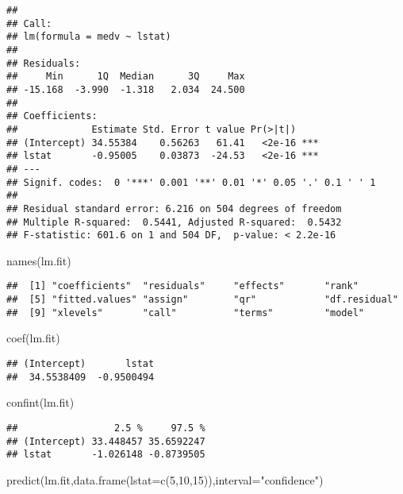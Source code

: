 \documentclass[
]{article}
\newenvironment{Shaded}{\begin{snugshade}}{\end{snugshade}}
\newcommand{\AttributeTok}[1]{\textcolor[rgb]{0.77,0.63,0.00}{#1}}
\newcommand{\DecValTok}[1]{\textcolor[rgb]{0.00,0.00,0.81}{#1}}
\newcommand{\FunctionTok}[1]{\textcolor[rgb]{0.00,0.00,0.00}{#1}}
\newcommand{\NormalTok}[1]{#1}
\newcommand{\StringTok}[1]{\textcolor[rgb]{0.31,0.60,0.02}{#1}}
\begin{document}
\begin{verbatim}
## 
## Call:
## lm(formula = medv ~ lstat)
## 
## Residuals:
##     Min      1Q  Median      3Q     Max 
## -15.168  -3.990  -1.318   2.034  24.500 
## 
## Coefficients:
##             Estimate Std. Error t value Pr(>|t|)    
## (Intercept) 34.55384    0.56263   61.41   <2e-16 ***
## lstat       -0.95005    0.03873  -24.53   <2e-16 ***
## ---
## Signif. codes:  0 '***' 0.001 '**' 0.01 '*' 0.05 '.' 0.1 ' ' 1
## 
## Residual standard error: 6.216 on 504 degrees of freedom
## Multiple R-squared:  0.5441, Adjusted R-squared:  0.5432 
## F-statistic: 601.6 on 1 and 504 DF,  p-value: < 2.2e-16
\end{verbatim}

\begin{Shaded}
\begin{Highlighting}[]
\FunctionTok{names}\NormalTok{(lm.fit)}
\end{Highlighting}
\end{Shaded}

\begin{verbatim}
##  [1] "coefficients"  "residuals"     "effects"       "rank"         
##  [5] "fitted.values" "assign"        "qr"            "df.residual"  
##  [9] "xlevels"       "call"          "terms"         "model"
\end{verbatim}

\begin{Shaded}
\begin{Highlighting}[]
\FunctionTok{coef}\NormalTok{(lm.fit)}
\end{Highlighting}
\end{Shaded}

\begin{verbatim}
## (Intercept)       lstat 
##  34.5538409  -0.9500494
\end{verbatim}

\begin{Shaded}
\begin{Highlighting}[]
\FunctionTok{confint}\NormalTok{(lm.fit)}
\end{Highlighting}
\end{Shaded}

\begin{verbatim}
##                 2.5 %     97.5 %
## (Intercept) 33.448457 35.6592247
## lstat       -1.026148 -0.8739505
\end{verbatim}

\begin{Shaded}
\begin{Highlighting}[]
\FunctionTok{predict}\NormalTok{(lm.fit,}\FunctionTok{data.frame}\NormalTok{(}\AttributeTok{lstat=}\FunctionTok{c}\NormalTok{(}\DecValTok{5}\NormalTok{,}\DecValTok{10}\NormalTok{,}\DecValTok{15}\NormalTok{)),}\AttributeTok{interval=}\StringTok{"confidence"}\NormalTok{)}
\end{Highlighting}
\end{Shaded}
\end{document}
